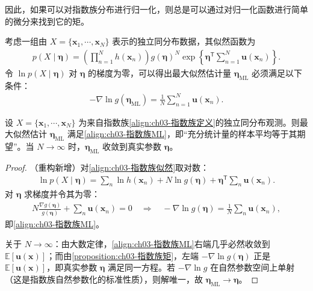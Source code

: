 \documentclass[../../main.tex]{subfiles}
\begin{document}
因此，如果可以对指数族分布进行归一化，则总是可以通过对归一化函数进行简单的微分来找到它的矩。

考虑一组由 $X=\{\boldsymbol{x}_1,\cdots,\boldsymbol{x}_N\}$ 表示的独立同分布数据，其似然函数为
\begin{align}
p(X\mid\boldsymbol{\eta})=\left(\prod_{n=1}^{N}h(\boldsymbol{x}_n)\right)g(\boldsymbol{\eta})^{N}\exp\left\{\boldsymbol{\eta}^{\mathsf{T}}\sum_{n=1}^{N}\boldsymbol{u}(\boldsymbol{x}_n)\right\}.
\label{align:ch03-指数族似然}
\end{align}
令 $\ln p(X\mid\boldsymbol{\eta})$ 对 $\boldsymbol{\eta}$ 的梯度为零，可以得出最大似然估计量 $\boldsymbol{\eta}_{\mathrm{ML}}$ 必须满足以下条件：
\begin{align}
-\nabla\ln g(\boldsymbol{\eta}_{\mathrm{ML}})=\frac{1}{N}\sum_{n=1}^{N}\boldsymbol{u}(\boldsymbol{x}_n).
\label{align:ch03-指数族ML}
\end{align}

\begin{proposition}[指数族分布的最大似然估计]\label{proposition:ch03-指数族最大似然}
设 $X=\{\boldsymbol{x}_1,\cdots,\boldsymbol{x}_N\}$ 为来自指数族\eqref{align:ch03-指数族定义}的独立同分布观测。则最大似然估计 $\boldsymbol{\eta}_{\mathrm{ML}}$ 满足\eqref{align:ch03-指数族ML}，即“充分统计量的样本平均等于其期望”。当 $N\to\infty$ 时，$\boldsymbol{\eta}_{\mathrm{ML}}$ 收敛到真实参数 $\boldsymbol{\eta}$。
\end{proposition}
\begin{proof}
（重构新增）对\eqref{align:ch03-指数族似然}取对数：
\begin{align*}
\ln p(X\mid\boldsymbol{\eta})=\sum_{n}\ln h(\boldsymbol{x}_n)+N\ln g(\boldsymbol{\eta})+\boldsymbol{\eta}^{\mathsf{T}}\sum_{n}\boldsymbol{u}(\boldsymbol{x}_n).
\end{align*}
对 $\boldsymbol{\eta}$ 求梯度并令其为零：
\begin{align*}
N\frac{\nabla g(\boldsymbol{\eta})}{g(\boldsymbol{\eta})}+\sum_{n}\boldsymbol{u}(\boldsymbol{x}_n)=0\quad\Longrightarrow\quad-\nabla\ln g(\boldsymbol{\eta})=\frac{1}{N}\sum_{n}\boldsymbol{u}(\boldsymbol{x}_n),
\end{align*}
即\eqref{align:ch03-指数族ML}。

关于 $N\to\infty$：由大数定律，\eqref{align:ch03-指数族ML}右端几乎必然收敛到 $\mathbb{E}[\boldsymbol{u}(\boldsymbol{x})]$；而由\cref{proposition:ch03-指数族矩}，左端 $-\nabla\ln g(\boldsymbol{\eta})$ 正是 $\mathbb{E}[\boldsymbol{u}(\boldsymbol{x})]$，即真实参数 $\boldsymbol{\eta}$ 满足同一方程。若 $-\nabla\ln g$ 在自然参数空间上单射（这是指数族自然参数化的标准性质），则解唯一，故 $\boldsymbol{\eta}_{\mathrm{ML}}\to\boldsymbol{\eta}$。
\end{proof}
\end{document}
